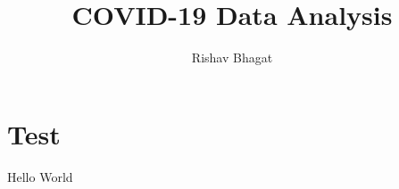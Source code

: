 \documentclass[oneside]{article}
\title{COVID-19 Data Analysis}
\author{Rishav Bhagat}
\begin{document}
    \maketitle
    \section{Test}
        Hello World
\end{document}
